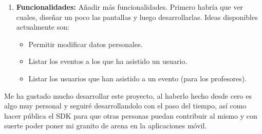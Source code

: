 \begin{enumerate}
\item \textbf{Funcionalidades: } Añadir más funcionalidades. Primero habría que ver cuales, diseñar un poco las pantallas y luego desarrollarlas. Ideas disponibles actualmente son: 
  \begin{itemize}
  \item Permitir modificar datos personales.
  \item Listar los eventos a los que ha asistido un usuario.
  \item Listar los usuarios que han asistido a un evento (para los profesores).
  \end{itemize}
\end{enumerate}

Me ha gustado mucho desarrollar este proyecto, al haberlo hecho desde cero es algo muy personal y seguiré desarrollandolo con el paso del tiempo, así como hacer pública el SDK para que otras personas puedan contribuir al mismo y con suerte poder poner mi granito de arena en la aplicaciones móvil. 
